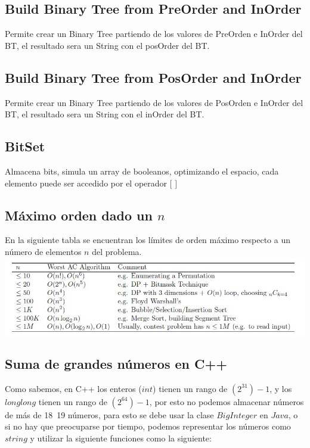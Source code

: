 \documentclass[10pt,letterpaper,twocolumn]{article}
\newcommand{\source}[1]{
  
  \dotfill
}
\begin{document}
  \subsection{Build Binary Tree from PreOrder and InOrder}
    Permite crear un Binary Tree partiendo de los valores de PreOrden e InOrder del BT, el resultado sera un String con el posOrder del BT.
    \source{./src/build-BT-from-pre-in.cpp}
   \subsection{Build Binary Tree from PosOrder and InOrder}
    Permite crear un Binary Tree partiendo de los valores de PosOrden e InOrder del BT, el resultado sera un String con el inOrder del BT.
    \source{./src/build-BT-from-pos-in.cpp}
  \subsection{BitSet}
    Almacena bits, simula un array de booleanos, optimizando el espacio, cada elemento puede ser accedido por el operador $[$ $]$\\
    \source{./src/bitset.cpp}
  \subsection{Máximo orden dado un $n$}
    En la siguiente tabla se encuentran los límites de orden máximo respecto a un número de elementos $n$ del problema.\\
    \includegraphics[scale=0.5]{./src/maxorder.jpg}
  \subsection{Suma de grandes números en C++}
    Como sabemos, en C++ los enteros ($int$) tienen un rango de $(2^31)-1$, y los $long long$ tienen un rango de $(2^64)-1$, por esto no podemos almacenar números de más de 18~19 números, para esto se debe usar la clase $BigInteger$ en $Java$, o si no hay que preocuparse por tiempo, podemos representar los números como $string$ y utilizar la siguiente funciones como la siguiente:
    \source{./src/bigIntegerCpp.cpp}
\end{document}
